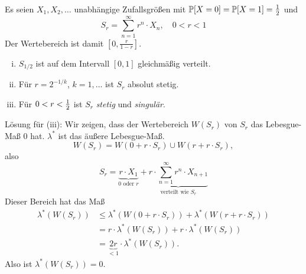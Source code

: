 \begin{exmp}
  Es seien $X_1, X_2, \ldots$ unabhängige Zufallsgrößen mit $\mathbb{P}[X=0] = \mathbb{P}[X=1]
  = \frac{1}{2}$ und
  \[ S_r = \sum_{n=1}^\infty r^n \cdot X_n, \quad 0 < r < 1 \]
  Der Wertebereich ist damit $\left[ 0, \frac{r}{1-r} \right]$.

  \begin{enumerate}[(i)]
  \item $S_{1/2}$ ist auf dem Intervall $[0,1]$ gleichmäßig verteilt.
  \item Für $r = 2^{-1/k}$, $k = 1, \ldots$ ist $S_r$ absolut stetig.
  \item Für $0 < r < \frac{1}{2}$ ist $S_r$ \emph{stetig} und \emph{singulär}.
  \end{enumerate}
  Lösung für (iii): Wir zeigen, dass der Wertebereich $W(S_r)$ von $S_r$ das
  Lebesgue-Maß 0 hat. $\lambda^*$ ist das äußere Lebesgue-Maß.
  \[ W(S_r) = W(0 + r \cdot S_r) \cup W(r + r \cdot S_r), \]
  also
  \[ S_r = \underbrace{r \cdot X_1}_{0 \text{ oder } r} +
    \underbrace{r \cdot \sum_{n=1}^\infty r^n \cdot X_{n+1}}_{\text{verteilt wie }
      S_r} \]
  Dieser Bereich hat das Maß
  \begin{align*}
    \lambda^*(W(S_r))
    &\le \lambda^*(W(0 + r \cdot S_r)) + \lambda^*(W(r + r \cdot S_r)) \\
    &= r \cdot \lambda^*(W(S_r)) + r \cdot \lambda^*(W(S_r)) \\
    &= \underbrace{2 r}_{<1} \cdot \lambda^*(W(S_r)).
  \end{align*}
  Also ist $\lambda^*(W(S_r)) = 0$.
\end{exmp}

